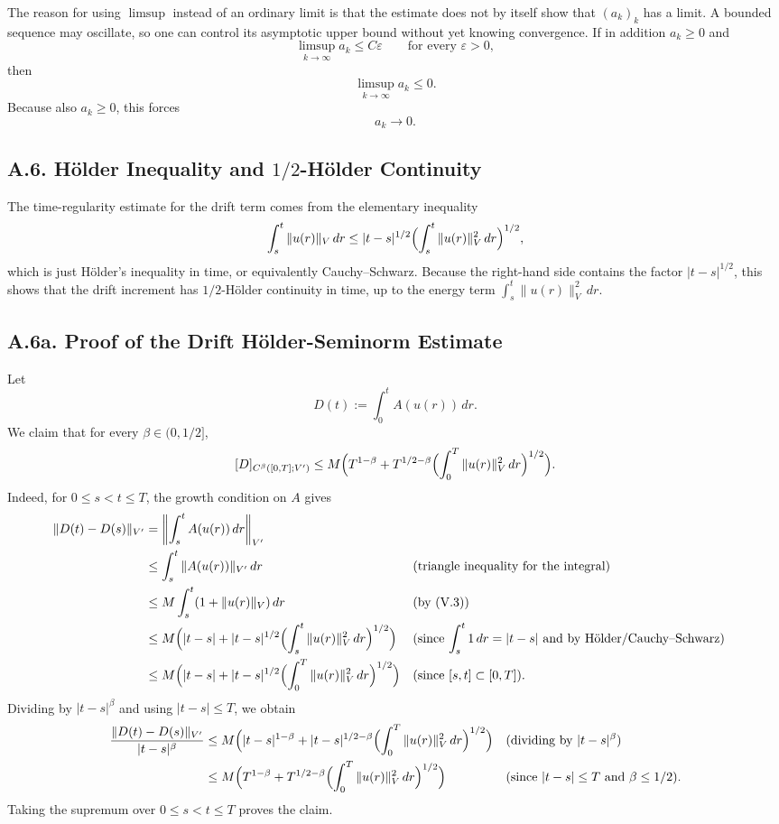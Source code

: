 \documentclass[11pt]{article}
\theoremstyle{definition}
\theoremstyle{remark}
\begin{document}
The reason for using $\limsup$ instead of an ordinary limit is that the estimate does not by itself show that $(a_k)_k$ has a limit. A bounded sequence may oscillate, so one can control its asymptotic upper bound without yet knowing convergence. If in addition $a_k\ge 0$ and
\[
  \limsup_{k\to\infty} a_k\le C\varepsilon
  \qquad \text{for every } \varepsilon>0,
\]
then
\[
  \limsup_{k\to\infty} a_k\le 0.
\]
Because also $a_k\ge 0$, this forces
\[
  a_k\to 0.
\]

\subsection*{A.6. H\"older Inequality and $1/2$-H\"older Continuity}
The time-regularity estimate for the drift term comes from the elementary inequality
\[
  \int_s^t \|u(r)\|_V\,dr
  \le
  |t-s|^{1/2}
  \Bigl(\int_s^t \|u(r)\|_V^2\,dr\Bigr)^{1/2},
\]
which is just H\"older's inequality in time, or equivalently Cauchy--Schwarz. Because the right-hand side contains the factor $|t-s|^{1/2}$, this shows that the drift increment has $1/2$-H\"older continuity in time, up to the energy term $\int_s^t \|u(r)\|_V^2\,dr$.

\subsection*{A.6a. Proof of the Drift H\"older-Seminorm Estimate}
Let
\[
  D(t):=\int_0^t A(u(r))\,dr.
\]
We claim that for every $\beta\in(0,1/2]$,
\[
  [D]_{C^\beta([0,T];V')}
  \le
  M\Bigl(
    T^{1-\beta}
    +
    T^{1/2-\beta}
    \Bigl(\int_0^T \|u(r)\|_V^2\,dr\Bigr)^{1/2}
  \Bigr).
\]
Indeed, for $0\le s<t\le T$, the growth condition on $A$ gives
\begin{align*}
  \|D(t)-D(s)\|_{V'}
  &=\left\|\int_s^t A(u(r))\,dr\right\|_{V'} \\
  &\le
  \int_s^t \|A(u(r))\|_{V'}\,dr
  &&\text{(triangle inequality for the integral)} \\
  &\le
  M\int_s^t (1+\|u(r)\|_V)\,dr
  &&\text{(by (V.3))} \\
  &\le
  M\Bigl(
    |t-s|
    +
    |t-s|^{1/2}
    \Bigl(\int_s^t \|u(r)\|_V^2\,dr\Bigr)^{1/2}
  \Bigr)
  &&\text{(since $\int_s^t 1\,dr=|t-s|$ and by H\"older/Cauchy--Schwarz)} \\
  &\le
  M\Bigl(
    |t-s|
    +
    |t-s|^{1/2}
    \Bigl(\int_0^T \|u(r)\|_V^2\,dr\Bigr)^{1/2}
  \Bigr)
  &&\text{(since $[s,t]\subset[0,T]$)}.
\end{align*}
Dividing by $|t-s|^\beta$ and using $|t-s|\le T$, we obtain
\begin{align*}
  \frac{\|D(t)-D(s)\|_{V'}}{|t-s|^\beta}
  &\le
  M\Bigl(
    |t-s|^{1-\beta}
    +
    |t-s|^{1/2-\beta}
    \Bigl(\int_0^T \|u(r)\|_V^2\,dr\Bigr)^{1/2}
  \Bigr)
  &&\text{(dividing by $|t-s|^\beta$)} \\
  &\le
  M\Bigl(
    T^{1-\beta}
    +
    T^{1/2-\beta}
    \Bigl(\int_0^T \|u(r)\|_V^2\,dr\Bigr)^{1/2}
  \Bigr)
  &&\text{(since $|t-s|\le T$ and $\beta\le 1/2$)}.
\end{align*}
Taking the supremum over $0\le s<t\le T$ proves the claim.
\end{document}
